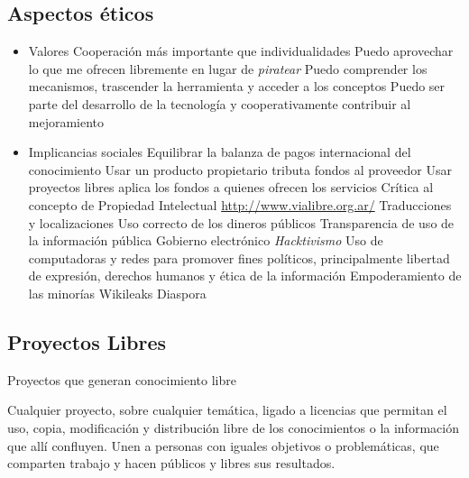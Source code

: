 \subsection {Aspectos éticos}
\begin{itemize}
	\item Valores
	\subitem Cooperación más importante que individualidades
	\subsubitem {}
	\subsubitem {}
	\subsubitem {}
	\subitem Puedo aprovechar lo que me ofrecen libremente en
lugar de \emph{piratear}
	\subitem Puedo comprender los mecanismos, trascender la herramienta y acceder a los conceptos
	\subitem Puedo ser parte del desarrollo de la tecnología y cooperativamente contribuir al mejoramiento

	\item Implicancias sociales
	\subitem Equilibrar la balanza de pagos internacional del conocimiento
		\subsubitem Usar un producto propietario tributa fondos al proveedor
		\subsubitem Usar proyectos libres aplica los fondos a quienes ofrecen los servicios
	\subitem Crítica al concepto de Propiedad Intelectual
		\subsubitem \url{http://www.vialibre.org.ar/}
	\subitem Traducciones y localizaciones
	\subitem Uso correcto de los dineros públicos
	\subitem Transparencia de uso de la información pública
	\subitem Gobierno electrónico
	\subitem \emph{Hacktivismo}
	\subsubitem Uso de computadoras y redes para promover fines políticos, principalmente libertad de expresión, derechos humanos y ética de la información
	\subsubitem Empoderamiento de las minorías
	\subsubitem Wikileaks
	\subsubitem Diaspora
\end{itemize}


\subsection{Proyectos Libres}

Proyectos que generan conocimiento libre

Cualquier proyecto, sobre cualquier temática, ligado a licencias que permitan el uso, copia, modificación y distribución libre de los conocimientos o la información que allí confluyen. Unen a personas con iguales objetivos o problemáticas, que comparten trabajo y hacen públicos y libres sus resultados.

